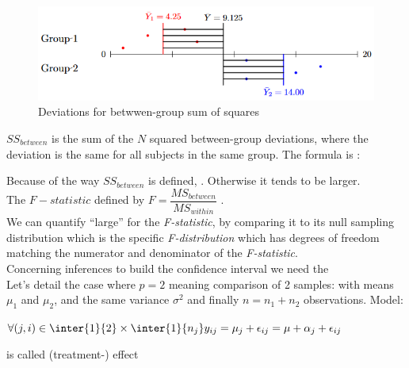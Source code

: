 \begin{figure}[H]
	\begin{center}
		\includegraphics[width=\textwidth]{./chapters/2_statistics/05_common_statistical_tests/2_images/2_anova_btw.PNG}
	\end{center}
	\caption{Deviations for betwwen-group sum of squares}
	\label{fig:4_anovaBtw}
\end{figure}
$SS_{between}$ is the sum of the $N$ squared between-group deviations, where the deviation is
the same for all subjects in the same group. The formula is : 
\begin{center}
\end{center}
Because of the way $SS_{between}$ is defined, . Otherwise it tends to be larger. \\
The $F-statistic$ defined by $F=\dfrac{MS_{between}}{MS_{within}}$ .\\

We can quantify ``large'' for the \emph{F-statistic}, by comparing it to its null sampling 
distribution which is the specific \emph{F-distribution}  which has degrees of freedom matching
the numerator and denominator of the \emph{F-statistic}.\\
Concerning inferences to build the confidence interval we need the \\
Let's detail the case where $p=2$ meaning comparison of  2 samples:
with means $\mu_{1}$ and $\mu_{2}$, and the same variance $\sigma^{2}$ and
finally $n=n_{1}+n_{2}$ observations.
Model: 
\begin{center}
	$\forall (j,i)\in\inter{1}{2}\times\inter{1}{n_{j}}y_{ij} = \mu_{j} + \epsilon_{ij} = \mu + \alpha_{j} + \epsilon_{ij}$
\end{center}
 is called (treatment-) effect

